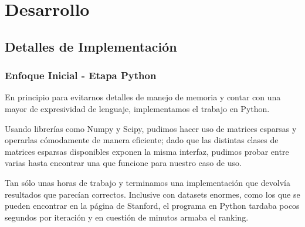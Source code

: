 \section{Desarrollo}

\subsection{Detalles de Implementación} %
\label{sub:detalles_de_implementaci_n}

\subsubsection{Enfoque Inicial - Etapa Python} %
\label{ssub:enfoque_inicial}

En principio para evitarnos detalles de manejo de memoria y contar con una mayor
de expresividad de lenguaje, implementamos el trabajo en Python.

Usando librerías como Numpy y Scipy, pudimos hacer uso de matrices
esparsas y operarlas cómodamente de manera eficiente; dado
que las distintas clases de matrices esparsas disponibles
exponen la misma interfaz, pudimos probar entre varias hasta encontrar
una que funcione para nuestro caso de uso.

Tan sólo unas horas de trabajo y terminamos una implementación
que devolvía resultados que parecían correctos. Inclusive con datasets
enormes, como los que se pueden encontrar en la página de Stanford,
el programa en Python tardaba pocos segundos por iteración y en cuestión de minutos armaba el ranking.

